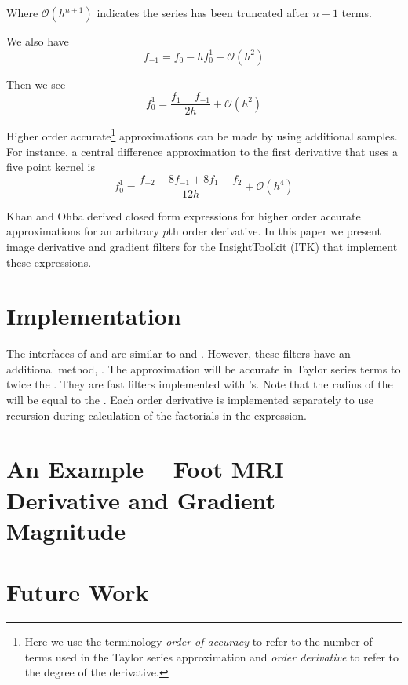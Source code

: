 \documentclass{InsightArticle}
\begin{document}
Where $\mathcal{O}(h^{n+1})$ indicates the series has been truncated after $n+1$
terms.

We also have
\begin{equation}
  f_{-1} = f_0 - h f^1_0 + \mathcal{O}(h^{2})
\end{equation}

Then we see
\begin{equation}
  f^1_0 = \frac{f_1 - f_{-1}} { 2 h } + \mathcal{O}(h^{2})
\end{equation}

Higher order accurate\footnote{Here we use the terminology \textit{order of
accuracy} to refer to the number of terms used in the Taylor series
approximation and \textit{order derivative} to refer to the degree of the
derivative.} approximations can be made by using additional samples.
For instance, a central difference approximation to the first derivative that uses a
five point kernel is
\begin{equation}
  f^1_0 = \frac{f_{-2} - 8 f_{-1} + 8 f_1 - f_2}{ 12 h } + \mathcal{O}(h^4)
\end{equation}

Khan and Ohba derived closed form expressions for higher order accurate
approximations for an arbitrary $p$th order derivative\cite{Khan1999,Khan2003}.
In this paper we present image derivative and gradient filters for the
InsightToolkit (ITK)\cite{itk} that implement these expressions.

\section{Implementation}

The interfaces of  and
 are similar to
 and .  However,
these filters have an additional method, .  The
approximation will be accurate in Taylor series terms to twice the
.  They are fast filters implemented with
's.  Note that the radius of the
 will be equal to the .
Each order derivative is implemented separately to use recursion during
calculation of the factorials in the expression\cite{Khan1999}.

\section{An Example -- Foot MRI Derivative and Gradient Magnitude}

\section{Future Work}



\end{document}
